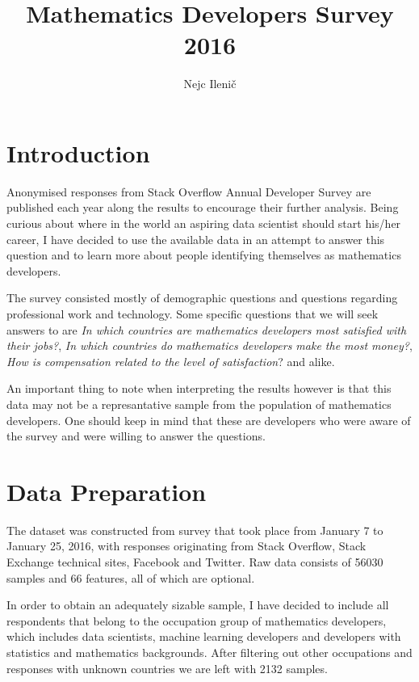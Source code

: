 \documentclass[9pt]{article}
\begin{document}





\title{Mathematics Developers Survey 2016}
\author{Nejc Ileni\v{c}}
\date{}
\maketitle

\section{Introduction}
Anonymised responses from Stack Overflow Annual Developer Survey are published each year along the results to encourage their further analysis. Being curious about where in the world an aspiring data scientist should start his/her career, I have decided to use the available data in an attempt to answer this question and to learn more about people identifying themselves as mathematics developers.

The survey consisted mostly of demographic questions and questions regarding professional work and technology. Some specific questions that we will seek answers to are \textit{In which countries are mathematics developers most satisfied with their jobs?}, \textit{In which countries do mathematics developers make the most money?}, \textit{How is compensation related to the level of satisfaction}? and alike.

\vspace{2mm}

An important thing to note when interpreting the results however is that this data may not be a represantative sample from the population of mathematics developers. One should keep in mind that these are developers who were aware of the survey and were willing to answer the questions.

\section{Data Preparation}
The dataset was constructed from survey that took place from January 7 to January 25, 2016, with responses originating from Stack Overflow, Stack Exchange technical sites, Facebook and Twitter. Raw data consists of 56030 samples and 66 features, all of which are optional.

In order to obtain an adequately sizable sample, I have decided to include all respondents that belong to the occupation group of mathematics developers, which includes data scientists, machine learning developers and developers with statistics and mathematics backgrounds. After filtering out other occupations and responses with unknown countries we are left with 2132 samples.
\end{document}
